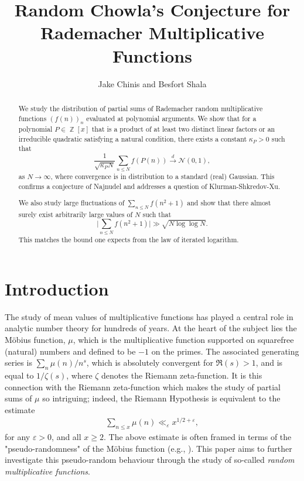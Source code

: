 \documentclass[11pts]{amsart}
\title{Random Chowla's Conjecture for Rademacher Multiplicative Functions}
\author{Jake Chinis and Besfort Shala} %
\numberwithin{equation}{section}
\DeclareMathOperator{\Z}{\mathbb{Z}}
\begin{document}
\begin{abstract}
We study the distribution of partial sums of Rademacher random multiplicative functions $(f(n))_n$ evaluated at polynomial arguments. We show that for a polynomial $P\in \Z[x]$ that is a product of at least two distinct linear factors or an irreducible quadratic satisfying a natural condition, there exists a constant $\kappa_P>0$ such that
    \[
    \frac{1}{\sqrt{\kappa_P N}}\sum_{n\leq N}f(P(n))\xrightarrow{d}\mathcal{N}(0,1),
    \]
    as $N\rightarrow\infty$, where convergence is in distribution to a standard (real) Gaussian. This confirms a conjecture of Najnudel and addresses a question of Klurman-Shkredov-Xu.



We also study large fluctuations of $\sum_{n\leq N}f(n^2+1)$ and show that there almost surely exist arbitrarily large values of $N$ such that
\[
\Big|\sum_{n\leq N}f(n^2+1)\Big|\gg \sqrt{N \log\log N}.
\]
This matches the bound one expects from the law of iterated logarithm.
\end{abstract}




\maketitle



\section{Introduction}

The study of mean values of multiplicative functions has played a central role in analytic number theory for hundreds of years. 
At the heart of the subject lies the M{\"o}bius function, $\mu$, which is the multiplicative function supported on squarefree (natural) numbers and defined to be $-1$ on the primes. The associated generating series is $\sum_n\mu(n)/n^s$, 
which is absolutely convergent for $\Re(s)>1$, and is equal to $1/\zeta(s)$, where $\zeta$ denotes the Riemann zeta-function. It is this connection with the Riemann zeta-function which makes the study of partial sums of $\mu$ so intriguing; indeed, 
the Riemann Hypothesis is equivalent to the estimate
\begin{align}
\label{RH_sqrt}
\sum_{n\leq x}\mu(n)\ll_\varepsilon x^{1/2+\varepsilon},
\end{align}
for any $\varepsilon>0$, and all $x\geq 2$. The above estimate is often framed in terms of the "pseudo-randomness" of the M{\"o}bius function (e.g., \cite[p. 338]{IwaKow}). This paper aims to further investigate this pseudo-random behaviour through the study of so-called \textit{random multiplicative functions}.
\end{document}
